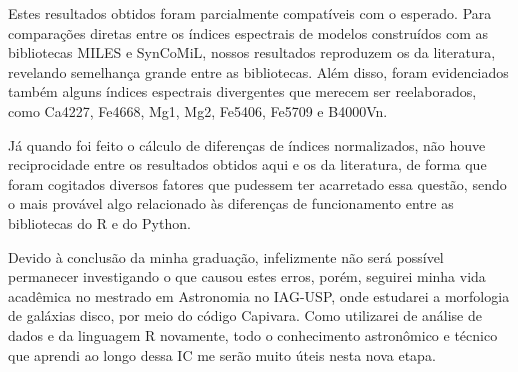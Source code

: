 \documentclass[12pt]{projeto}
\begin{document}
Estes resultados obtidos foram parcialmente compatíveis com o esperado. Para comparações diretas entre os índices espectrais de modelos construídos com as bibliotecas MILES e SynCoMiL, nossos resultados reproduzem os da literatura, revelando semelhança grande entre as bibliotecas. Além disso, foram evidenciados também alguns índices espectrais divergentes que merecem ser reelaborados, como Ca4227, Fe4668, Mg1, Mg2, Fe5406, Fe5709 e B4000Vn.

Já quando foi feito o cálculo de diferenças de índices normalizados, não houve reciprocidade entre os resultados obtidos aqui e os da literatura, de forma que foram cogitados diversos fatores que pudessem ter acarretado essa questão, sendo o mais provável algo relacionado às diferenças de funcionamento entre as bibliotecas do R e do Python.

Devido à conclusão da minha graduação, infelizmente não será possível permanecer investigando o que causou estes erros, porém, seguirei minha vida acadêmica no mestrado em Astronomia no IAG-USP, onde estudarei a morfologia de galáxias disco, por meio do código Capivara. Como utilizarei de análise de dados e da linguagem R novamente, todo o conhecimento astronômico e técnico que aprendi ao longo dessa IC me serão muito úteis nesta nova etapa. 
\end{document}

